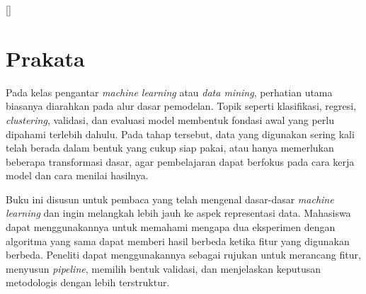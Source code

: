 \begingroup
\titleformat{\chapter}[display]{\sffamily}{}{0pt}{\vspace*{65pt}\Huge\bfseries\color{black}\raggedright}[\vspace{7pt}{\color{rulegray}\titlerule[1.4pt]}]
\chapter*{Prakata}

Pada kelas pengantar \emph{machine learning} atau \emph{data mining}, perhatian utama biasanya diarahkan pada alur dasar pemodelan. Topik seperti klasifikasi, regresi, \emph{clustering}, validasi, dan evaluasi model membentuk fondasi awal yang perlu dipahami terlebih dahulu. Pada tahap tersebut, data yang digunakan sering kali telah berada dalam bentuk yang cukup siap pakai, atau hanya memerlukan beberapa transformasi dasar, agar pembelajaran dapat berfokus pada cara kerja model dan cara menilai hasilnya.

Buku ini disusun untuk pembaca yang telah mengenal dasar-dasar \emph{machine learning} dan ingin melangkah lebih jauh ke aspek representasi data. Mahasiswa dapat menggunakannya untuk memahami mengapa dua eksperimen dengan algoritma yang sama dapat memberi hasil berbeda ketika fitur yang digunakan berbeda. Peneliti dapat menggunakannya sebagai rujukan untuk merancang fitur, menyusun \emph{pipeline}, memilih bentuk validasi, dan menjelaskan keputusan metodologis dengan lebih terstruktur.

